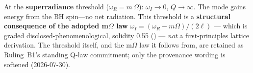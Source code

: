 \noindent At the \textbf{superradiance} threshold ($\omega_R = m\,\Omega$): $\omega_I \to 0$, $Q \to \infty$.  The mode gains energy from the BH spin---no net radiation.  This threshold is a \textbf{structural consequence of the adopted m$\Omega$ law} $\omega_I = (\omega_R - m\Omega)/(2\ell)$ --- which is graded disclosed-phenomenological, solidity 0.55 () --- \emph{not} a first-principles lattice derivation.  The threshold itself, and the m$\Omega$ law it follows from, are retained as Ruling~B1's standing Q-law commitment; only the provenance wording is softened (2026-07-30).

